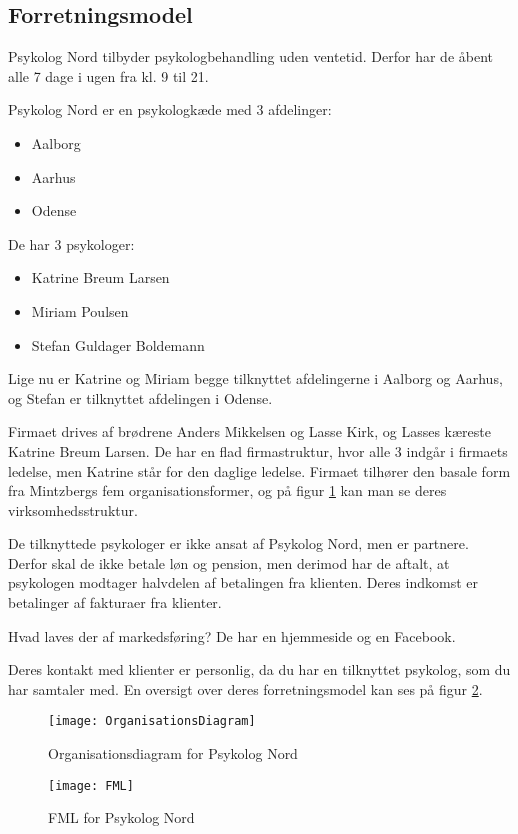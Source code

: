 \subsection{Forretningsmodel}
\label{section:forretningsmodel}

Psykolog Nord tilbyder psykologbehandling uden ventetid.
Derfor har de åbent alle 7 dage i ugen fra kl. 9 til 21.

Psykolog Nord er en psykologkæde med 3 afdelinger:
\begin{itemize}
    \item Aalborg
    \item Aarhus
    \item Odense
\end{itemize}

De har 3 psykologer:

\begin{itemize}
    \item Katrine Breum Larsen
    \item Miriam Poulsen
    \item Stefan Guldager Boldemann
\end{itemize}

Lige nu er Katrine og Miriam begge tilknyttet afdelingerne i Aalborg og Aarhus, og Stefan er tilknyttet afdelingen i Odense.


Firmaet drives af brødrene Anders Mikkelsen og Lasse Kirk, og Lasses kæreste Katrine Breum Larsen.
De har en flad firmastruktur, hvor alle 3 indgår i firmaets ledelse, men Katrine står for den daglige ledelse. 
Firmaet tilhører den basale form fra Mintzbergs fem organisationsformer, og på 
figur \ref{forretning:organisationsdiagram} kan man se deres virksomhedsstruktur.

De tilknyttede psykologer er ikke ansat af Psykolog Nord, men er partnere.
Derfor skal de ikke betale løn og pension, men derimod har de aftalt, at psykologen modtager halvdelen af betalingen fra klienten.
Deres indkomst er betalinger af fakturaer fra klienter.

Hvad laves der af markedsføring? De har en hjemmeside og en Facebook.

Deres kontakt med klienter er personlig, da du har en tilknyttet psykolog, som 
du har samtaler med. En oversigt over deres forretningsmodel kan ses på figur \ref{forretning:fml}.

\begin{figure}
    \caption{Organisationsdiagram for Psykolog Nord}
    \centering
        \texttt{[image: OrganisationsDiagram]}
    \label{forretning:organisationsdiagram}
\end{figure}

\begin{figure}
    \caption{FML for Psykolog Nord}
    \centering
        \texttt{[image: FML]}
    \label{forretning:fml}
\end{figure}

